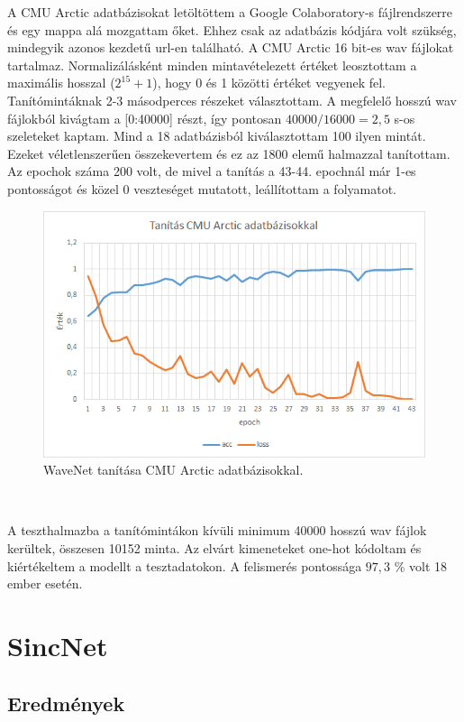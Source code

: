 A CMU Arctic adatbázisokat letöltöttem a Google Colaboratory-s fájlrendszerre és egy mappa alá mozgattam őket. Ehhez csak az adatbázis kódjára volt szükség, mindegyik azonos kezdetű url-en található.
A CMU Arctic 16 bit-es wav fájlokat tartalmaz. Normalizálásként minden mintavételezett értéket leosztottam a maximális hosszal ($2^15 + 1$), hogy 0 és 1 közötti értéket vegyenek fel.
\newline
\newline
Tanítómintáknak 2-3 másodperces részeket választottam. A megfelelő hosszú wav fájlokból kivágtam a [0:40000] részt, így pontosan $40000/16000 = 2,5$ s-os szeleteket kaptam. Mind a 18 adatbázisból kiválasztottam 100 ilyen mintát. Ezeket véletlenszerűen összekevertem és ez az 1800 elemű halmazzal tanítottam. Az epochok száma 200 volt, de mivel a tanítás a 43-44. epochnál már 1-es pontosságot és közel 0 veszteséget mutatott, leállítottam a folyamatot. 
\newline
\newline
\begin{figure}[!ht]
	\centering
	\includegraphics[width=150mm, keepaspectratio]{figures/wavenet-train-cmu-arctic.png}
	\caption{WaveNet tanítása CMU Arctic adatbázisokkal.}
	\label{fig:wavenet-train-cmu-arctic}
\end{figure}
\ \\
\newline
\newline

A teszthalmazba a tanítómintákon kívüli minimum 40000 hosszú wav fájlok kerültek, összesen 10152 minta.
Az elvárt kimeneteket one-hot kódoltam és kiértékeltem a modellt a tesztadatokon. A felismerés pontossága $97,3$ \% volt 18 ember esetén.

\section{SincNet}



\subsection{Eredmények}